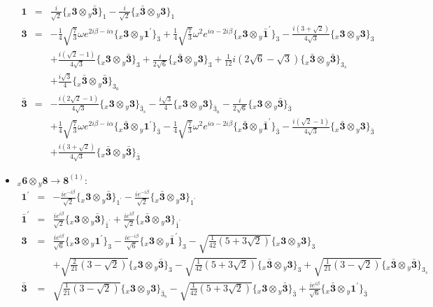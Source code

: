 \documentclass[english]{article}
\newcommand{\rep}[1]{\mathbf{#1}}
\newcommand{\repx}[2]{{}_{#2}\mathbf{#1}}
\newcommand{\subcg}[3]{\big\{ \repx{#1}{x}\otimes\repx{#2}{y}\big\}^{}_{#3}}
\begin{document}
\begin{itemize}
\begin{eqnarray*}
\rep{1} &=& \frac{i}{\sqrt{2}}\subcg{3}{\bar{3}}{1}-\frac{i}{\sqrt{2}}\subcg{\bar{3}}{3}{1}
\\
\rep{3} &=& -\frac{1}{4} \sqrt{\frac{7}{3}} \omega  e^{2 i \beta -i \alpha }\subcg{3}{1^{\prime}}{3}+\frac{1}{4} \sqrt{\frac{7}{3}} \omega ^2 e^{i \alpha -2 i \beta }\subcg{3}{\bar{1}^{\prime}}{3}-\frac{i \left(3+\sqrt{2}\right)}{4 \sqrt{3}}\subcg{3}{3}{3} \\ 
 & & +\frac{i \left(\sqrt{2}-1\right)}{4 \sqrt{3}}\subcg{3}{\bar{3}}{3}+\frac{i}{2 \sqrt{6}}\subcg{\bar{3}}{3}{3}+\frac{1}{12} i \left(2 \sqrt{6}-\sqrt{3}\right)\subcg{\bar{3}}{\bar{3}}{3_{s}} \\ 
 & & +\frac{i \sqrt{3}}{4}\subcg{\bar{3}}{\bar{3}}{3_{a}}
\\
\rep{\bar{3}} &=& -\frac{i \left(2 \sqrt{2}-1\right)}{4 \sqrt{3}}\subcg{3}{3}{\bar{3}_{s}}-\frac{i \sqrt{3}}{4}\subcg{3}{3}{\bar{3}_{a}}-\frac{i}{2 \sqrt{6}}\subcg{3}{\bar{3}}{\bar{3}} \\ 
 & & +\frac{1}{4} \sqrt{\frac{7}{3}} \omega  e^{2 i \beta -i \alpha }\subcg{\bar{3}}{1^{\prime}}{\bar{3}}-\frac{1}{4} \sqrt{\frac{7}{3}} \omega ^2 e^{i \alpha -2 i \beta }\subcg{\bar{3}}{\bar{1}^{\prime}}{\bar{3}}-\frac{i \left(\sqrt{2}-1\right)}{4 \sqrt{3}}\subcg{\bar{3}}{3}{\bar{3}} \\ 
 & & +\frac{i \left(3+\sqrt{2}\right)}{4 \sqrt{3}}\subcg{\bar{3}}{\bar{3}}{\bar{3}}
\end{eqnarray*}
\item $\repx{6}{x}\otimes\repx{8}{y}\to\rep{8}^{(1)}$:
\begin{eqnarray*}
\rep{1^{\prime}} &=& -\frac{i e^{-i \beta }}{\sqrt{2}}\subcg{3}{\bar{3}}{1^{\prime}}-\frac{i e^{-i \beta }}{\sqrt{2}}\subcg{\bar{3}}{3}{1^{\prime}}
\\
\rep{\bar{1}^{\prime}} &=& \frac{i e^{i \beta }}{\sqrt{2}}\subcg{3}{\bar{3}}{\bar{1}^{\prime}}+\frac{i e^{i \beta }}{\sqrt{2}}\subcg{\bar{3}}{3}{\bar{1}^{\prime}}
\\
\rep{3} &=& \frac{i e^{i \beta }}{\sqrt{6}}\subcg{3}{1^{\prime}}{3}-\frac{i e^{-i \beta }}{\sqrt{6}}\subcg{3}{\bar{1}^{\prime}}{3}-\sqrt{\frac{1}{42} \left(5+3 \sqrt{2}\right)}\subcg{3}{3}{3} \\ 
 & & +\sqrt{\frac{2}{21} \left(3-\sqrt{2}\right)}\subcg{3}{\bar{3}}{3}-\sqrt{\frac{1}{42} \left(5+3 \sqrt{2}\right)}\subcg{\bar{3}}{3}{3}+\sqrt{\frac{1}{21} \left(3-\sqrt{2}\right)}\subcg{\bar{3}}{\bar{3}}{3_{s}}
\\
\rep{\bar{3}} &=& \sqrt{\frac{1}{21} \left(3-\sqrt{2}\right)}\subcg{3}{3}{\bar{3}_{s}}-\sqrt{\frac{1}{42} \left(5+3 \sqrt{2}\right)}\subcg{3}{\bar{3}}{\bar{3}}+\frac{i e^{i \beta }}{\sqrt{6}}\subcg{\bar{3}}{1^{\prime}}{\bar{3}} \\ 

\end{eqnarray*}
\end{itemize}
\end{document}

